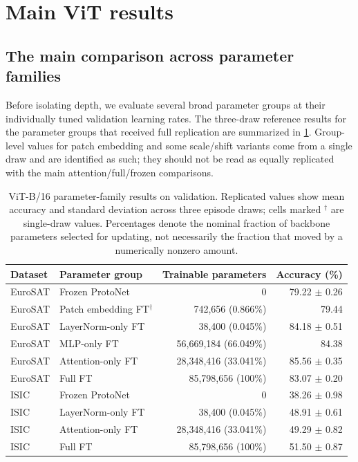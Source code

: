 \documentclass[11pt]{article}
\begin{document}
\section{Main ViT results}
\label{sec:results}

\subsection{The main comparison across parameter families}

Before isolating depth, we evaluate several broad parameter groups at their individually tuned validation learning rates. The three-draw reference results for the parameter groups that received full replication are summarized in \cref{tab:vitgroups}. Group-level values for patch embedding and some scale/shift variants come from a single draw and are identified as such; they should not be read as equally replicated with the main attention/full/frozen comparisons.

\begin{table}[t]
\centering
\small
\caption{ViT-B/16 parameter-family results on validation. Replicated values show mean accuracy and standard deviation across three episode draws; cells marked $^\dagger$ are single-draw values. Percentages denote the nominal fraction of backbone parameters selected for updating, not necessarily the fraction that moved by a numerically nonzero amount.}
\label{tab:vitgroups}
\begin{tabular}{llrr}
\toprule
Dataset & Parameter group & Trainable parameters & Accuracy (\%)\\
\midrule
EuroSAT & Frozen ProtoNet & 0 & 79.22 $\pm$ 0.26\\
EuroSAT & Patch embedding FT$^\dagger$ & 742,656 (0.866\%) & 79.44\\
EuroSAT & LayerNorm-only FT & 38,400 (0.045\%) & 84.18 $\pm$ 0.51\\
EuroSAT & MLP-only FT & 56,669,184 (66.049\%) & 84.38\\
EuroSAT & Attention-only FT & 28,348,416 (33.041\%) & 85.56 $\pm$ 0.35\\
EuroSAT & Full FT & 85,798,656 (100\%) & 83.07 $\pm$ 0.20\\
\midrule
ISIC & Frozen ProtoNet & 0 & 38.26 $\pm$ 0.98\\
ISIC & LayerNorm-only FT & 38,400 (0.045\%) & 48.91 $\pm$ 0.61\\
ISIC & Attention-only FT & 28,348,416 (33.041\%) & 49.29 $\pm$ 0.82\\
ISIC & Full FT & 85,798,656 (100\%) & 51.50 $\pm$ 0.87\\
\bottomrule
\end{tabular}
\end{table}
\end{document}

